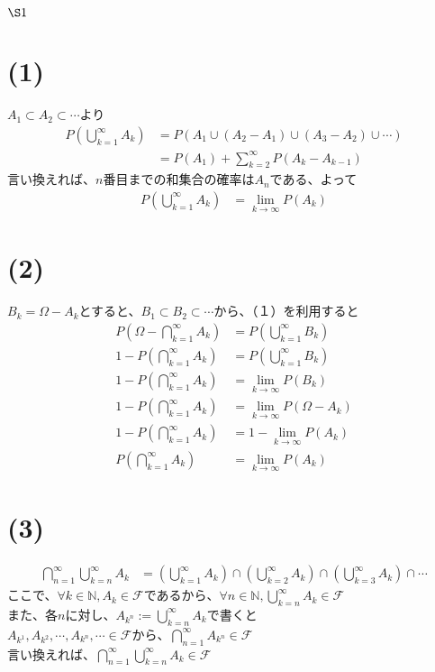 \documentclass[11pt]{article}
\newcommand{\ds}{\displaystyle}
\begin{document}
	\CJKfont
	\begin{center}
		$\S1$
	\end{center}
	\section*{(1)}
	$A_{1}\subset A_{2}\subset\cdots$より
	\begin{align*}
		P\left(\bigcup\limits_{k=1}^{\infty}A_{k}\right)
		&=P\left(A_{1}\cup\left(A_{2}-A_{1}\right)\cup\left(A_{3}-A_{2}\right)\cup\cdots\right)\\
		&=P\left(A_{1}\right)+\ds\sum_{k=2}^{\infty}P\left(A_{k}-A_{k-1}\right)
	\end{align*}
	言い換えれば、$n$番目までの和集合の確率は$A_{n}$である、よって
	\begin{align*}
		P\left(\bigcup\limits_{k=1}^{\infty}A_{k}\right)&=\ds\lim_{k\rightarrow\infty}P\left(A_{k}\right)
	\end{align*}
	
	\section*{(2)}
	$B_{k}=\Omega-A_{k}$とすると、$B_{1}\subset B_{2}\subset\cdots$から、（１）を利用すると
	\begin{align*}
		P\left(\Omega-\bigcap\limits_{k=1}^{\infty}A_{k}\right)
		&=P\left(\bigcup\limits_{k=1}^{\infty}B_{k}\right)\\
		1-P\left(\bigcap\limits_{k=1}^{\infty}A_{k}\right)&=P\left(\bigcup\limits_{k=1}^{\infty}B_{k}\right)\\
		1-P\left(\bigcap\limits_{k=1}^{\infty}A_{k}\right)&=\ds\lim_{k\rightarrow\infty}P\left(B_{k}\right)\\
		1-P\left(\bigcap\limits_{k=1}^{\infty}A_{k}\right)&=\ds\lim_{k\rightarrow\infty}P\left(\Omega-A_{k}\right)\\
		1-P\left(\bigcap\limits_{k=1}^{\infty}A_{k}\right)&=1-\ds\lim_{k\rightarrow\infty}P\left(A_{k}\right)\\
		P\left(\bigcap\limits_{k=1}^{\infty}A_{k}\right)&=\ds\lim_{k\rightarrow\infty}P\left(A_{k}\right)
	\end{align*}
	
	\section*{(3)}
	\begin{align*}
		\bigcap\limits_{n=1}^{\infty}\bigcup\limits_{k=n}^{\infty}A_{k}
		&=\left(\bigcup\limits_{k=1}^{\infty}A_{k}\right)\cap\left(\bigcup\limits_{k=2}^{\infty}A_{k}\right)\cap\left(\bigcup\limits_{k=3}^{\infty}A_{k}\right)\cap\cdots
	\end{align*}
	ここで、$\forall k\in\mathbb{N},A_{k}\in\mathscr{F}$であるから、$\forall n\in\mathbb{N},\bigcup\limits_{k=n}^{\infty}A_{k}\in\mathscr{F}$\\
	また、各$n$に対し、$A_{k^{n}}:=\bigcup\limits_{k=n}^{\infty}A_{k}$で書くと\\
	$A_{k^{1}},A_{k^{2}},\cdots,A_{k^{n}},\cdots\in\mathscr{F}$から、$\bigcap\limits_{n=1}^{\infty}A_{k^{n}}\in\mathscr{F}$\\
	言い換えれば、$\bigcap\limits_{n=1}^{\infty}\bigcup\limits_{k=n}^{\infty}A_{k}\in\mathscr{F}$
	
\end{document}
